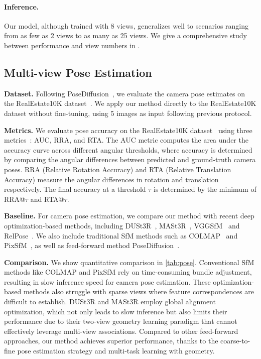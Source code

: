 \paragraph{Inference.}
Our model, although trained with 8 views, generalizes well to scenarios ranging from as few as 2 views to as many as 25 views. We give a comprehensive study between performance and view numbers in \supp. 

\subsection{Multi-view Pose Estimation}
\noindent\textbf{Dataset.}
Following PoseDiffusion~\cite{wang2023posediffusion}, we evaluate the camera pose estimates on the RealEstate10K dataset~\cite{zhou2018stereo}. We apply our method directly to the RealEstate10K dataset without fine-tuning, using 5 images as input following previous protocol. 

\noindent\textbf{Metrics.}
We evaluate pose accuracy on the RealEstate10K dataset~\cite{zhou2018stereo} using three metrics~\cite{jin2021image, wang2023posediffusion}: AUC, RRA, and RTA.
%
The AUC metric computes the area under the accuracy curve across different angular thresholds, where accuracy is determined by comparing the angular differences between predicted and ground-truth camera poses.
%
RRA (Relative Rotation Accuracy) and RTA (Relative Translation Accuracy) measure the angular differences in rotation and translation respectively. The final accuracy at a threshold $\tau$ is determined by the minimum of RRA@$\tau$ and RTA@$\tau$.


\noindent\textbf{Baseline.}
For camera pose estimation, we compare our method with recent deep optimization-based methods, including DUSt3R~\cite{wang2024dust3r}, MASt3R~\cite{leroy2024grounding}, VGGSfM~\cite{wang2024vggsfm} and RelPose~\cite{zhang2022relpose}. We also include traditional SfM methods such as COLMAP~\cite{schoenberger2016sfm} and PixSfM~\cite{schonberger2016pixelwise}, as well as feed-forward method PoseDiffusion~\cite{wang2023posediffusion}.
%

\noindent\textbf{Comparison.} We show quantitative comparison in \cref{tab:pose}.
Conventional SfM methods like COLMAP and PixSfM rely on time-consuming bundle adjustment, resulting in slow inference speed for camera pose estimation. These optimization-based methods also struggle with sparse views where feature correspondences are difficult to establish.
%
DUSt3R and MASt3R employ global alignment optimization, which not only leads to slow inference but also limits their performance due to their two-view geometry learning paradigm that cannot effectively leverage multi-view associations.
%
Compared to other feed-forward approaches, our method achieves superior performance, thanks to the coarse-to-fine pose estimation strategy and multi-task learning with geometry.


